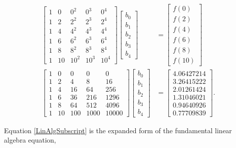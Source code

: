 \begin{align} \label{realValues}
\begin{bmatrix}
1 & 0 & 0^2 & 0^3 & 0^4 \\
1 & 2 & 2^2 & 2^3 & 2^4 \\
1 & 4 & 4^2 & 4^3 & 4^4 \\
1 & 6 & 6^2 & 6^3 & 6^4 \\
1 & 8 & 8^2 & 8^3 & 8^4 \\
1 & 10 & 10^2 & 10^3 & 10^4
\end{bmatrix}
\begin{bmatrix}
b_0 \\
b_1 \\
b_2 \\
b_3 \\
b_4 
\end{bmatrix}
&=
\begin{bmatrix}
f(0) \\ 
f(2) \\
f(4) \\ 
f(6) \\
f(8) \\
f(10)
\end{bmatrix} \\
\begin{bmatrix}
1 & 0 & 0 & 0 & 0 \\
1 & 2 & 4 & 8 & 16 \\
1 & 4 & 16 & 64 & 256 \\
1 & 6 & 36 & 216 & 1296 \\
1 & 8 & 64 & 512 & 4096 \\
1 & 10 & 100 & 1000 & 10000
\end{bmatrix}
\begin{bmatrix}
b_0 \\
b_1 \\
b_2 \\
b_3 \\
b_4 
\end{bmatrix}
&=
\begin{bmatrix}
4.06427214 \\ 
3.26415222 \\
2.01261424 \\ 
1.31046021 \\
0.94640926 \\
0.77709839
\end{bmatrix}\label{realValuesSimp}.
\end{align}

\par Equation \ref{LinAlgSubscript} is the expanded form of the fundamental linear algebra equation, 

